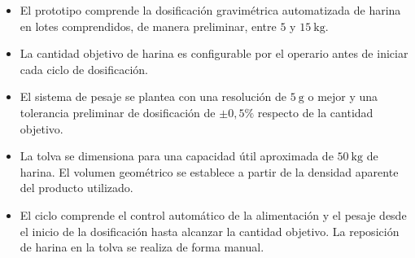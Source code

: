 \begin{itemize}

    \item El prototipo comprende la dosificación gravimétrica automatizada
    de harina en lotes comprendidos, de manera preliminar, entre
    $5$ y $15\ \mathrm{kg}$.

    \item La cantidad objetivo de harina es configurable por el operario
    antes de iniciar cada ciclo de dosificación.

    \item El sistema de pesaje se plantea con una resolución de
    $5\ \mathrm{g}$ o mejor y una tolerancia preliminar de dosificación
    de $\pm 0{,}5\%$ respecto de la cantidad objetivo.

    \item La tolva se dimensiona para una capacidad útil aproximada de
    $50\ \mathrm{kg}$ de harina. El volumen geométrico se establece a
    partir de la densidad aparente del producto utilizado.

    \item El ciclo comprende el control automático de la alimentación y
    el pesaje desde el inicio de la dosificación hasta alcanzar la cantidad
    objetivo. La reposición de harina en la tolva se realiza de forma manual.

\end{itemize}

\clearpage
\flushbottom
